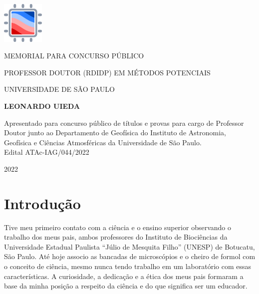 \documentclass[11pt,a4paper,oneside]{book}
\newcommand{\Author}{%
  Leonardo Uieda
}
\newcommand{\Year}{%
  2022
}
\newcommand{\fancyfront}{%
    \fancyhf{} %
    \fancyfoot[C]{\thepage}
    \renewcommand{\headrulewidth}{0pt}
    \renewcommand{\footrulewidth}{0pt}

    \fancypagestyle{plain}{%
        \fancyhf{} %
        \fancyfoot[C]{\thepage}
        \renewcommand{\headrulewidth}{0pt}
        \renewcommand{\footrulewidth}{0pt}
    }
}
\newcommand{\fancymain}{%
    \fancyhf{} %
    \fancyhead[RO,LE]{\thepage}
    \fancyhead[RE]{\leftmark}
    \fancyhead[LO]{\nouppercase{\rightmark}}
    \renewcommand{\headrulewidth}{0.4pt}

    \fancypagestyle{plain}{%
        \fancyhf{} %
        \renewcommand{\headrulewidth}{0pt}
        \renewcommand{\footrulewidth}{0pt}
    }

}
\begin{document}
\frontmatter
\fancyfront

\begin{titlepage}
  \begin{center}
    \includegraphics[height=2cm]{images/logo.pdf}
    \vspace{1cm}

    MEMORIAL PARA CONCURSO PÚBLICO

    PROFESSOR DOUTOR (RDIDP) EM MÉTODOS POTENCIAIS

    UNIVERSIDADE DE SÃO PAULO
    \vspace{4cm}

    \textbf{\LARGE \MakeUppercase{\Author{}}}
    \vspace{5cm}

    \begin{minipage}[t]{0.6\textwidth}
      \begin{center}
        {\small
          Apresentado para concurso público de títulos e provas para cargo de
          Professor Doutor junto ao Departamento de Geofísica do Instituto de
          Astronomia, Geofísica e Ciências Atmosféricas da Universidade de São
          Paulo.
          \\
          Edital ATAc-IAG/044/2022
        }
      \end{center}
    \end{minipage}
    \vfill

    \Year{}
  \end{center}
\end{titlepage}

\tableofcontents

\mainmatter
\fancymain

\chapter{Introdução}

Tive meu primeiro contato com a ciência e o ensino superior observando o
trabalho dos meus pais, ambos professores do Instituto de Biociências da
Universidade Estadual Paulista ``Júlio de Mesquita Filho'' (UNESP) de Botucatu,
São Paulo.
Até hoje associo as bancadas de microscópios e o cheiro de formol com o
conceito de ciência, mesmo nunca tendo trabalho em um laboratório com essas
características.
A curiosidade, a dedicação e a ética dos meus pais formaram a base da minha
posição a respeito da ciência e do que significa ser um educador.
\end{document}
